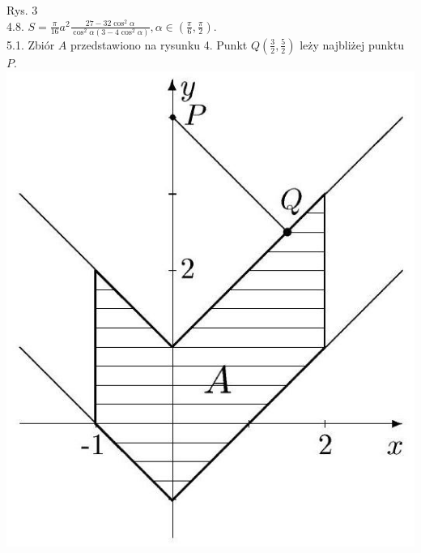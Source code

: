 \documentclass[10pt]{article}
\begin{document}
Rys. 3\\
4.8. $S=\frac{\pi}{16} a^{2} \frac{27-32 \cos ^{2} \alpha}{\cos ^{2} \alpha\left(3-4 \cos ^{2} \alpha\right)}, \alpha \in\left(\frac{\pi}{6}, \frac{\pi}{2}\right)$.\\
5.1. Zbiór $A$ przedstawiono na rysunku 4. Punkt $Q\left(\frac{3}{2}, \frac{5}{2}\right)$ leży najbliżej punktu $P$.\\
\includegraphics[max width=\textwidth, center]{2024_11_16_fe5b564401bf7db98894g-055}
\end{document}

